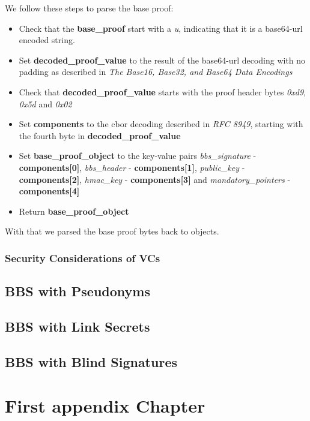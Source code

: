 \documentclass[
	a4paper               %
	,bibliography=totoc   %
	,listof=totoc         %
	,monolingual
	twoside=false,
]{bfhthesis}              %
\begin{document}
We follow these steps to parse the base proof:
\begin{itemize}
	\item Check that the \textbf{base\_proof} start with a \textit{u}, indicating that it is a base64-url encoded string.
	\item Set \textbf{decoded\_proof\_value} to the result of the base64-url decoding with no padding as described in \textit{The Base16, Base32, and Base64 Data Encodings}\cite{base64}
	\item Check that \textbf{decoded\_proof\_value} starts with the proof header bytes \textit{0xd9}, \textit{0x5d} and \textit{0x02}
	\item Set \textbf{components} to the cbor decoding described in \textit{RFC 8949}\cite{cbor}, starting with the fourth byte in \textbf{decoded\_proof\_value}
	\item Set \textbf{base\_proof\_object} to the key-value pairs \textit{bbs\_signature} - \textbf{components[0]}, \textit{bbs\_header} - \textbf{components[1]}, \textit{public\_key} - \textbf{components[2]}, \textit{hmac\_key} - \textbf{components[3]} and \textit{mandatory\_pointers} - \textbf{components[4]}
	\item Return \textbf{base\_proof\_object}
\end{itemize}

With that we parsed the base proof bytes back to objects.


\subsection{Security Considerations of VCs}
\label{subsec:vcseccons}

\section{BBS with Pseudonyms}
\label{chap:Pseudonyms}

\section{BBS with Link Secrets}
\label{chap:linksecrets}

\section{BBS with Blind Signatures}
\label{chap:blindsignatures}




\appendix


\chapter{First appendix Chapter}





\end{document}
